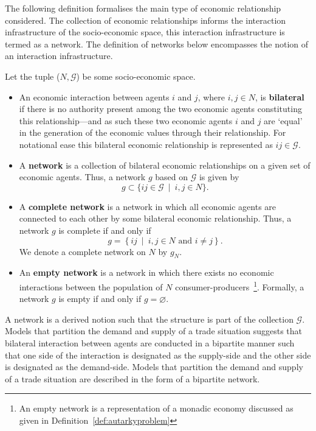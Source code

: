 The following definition formalises the main type of economic relationship considered. The collection of economic relationships informs the interaction infrastructure of the socio-economic space, this interaction infrastructure is termed as a network. The definition of networks below encompasses the notion of an interaction infrastructure.
\begin{definition}[Networks] \label{def:networks}
Let the tuple ($N, \mathcal{G}$) be some socio-economic space.
\begin{itemize}
	\item An economic interaction between agents $i$ and $j$, where $i,j \in N$, is \textbf{bilateral} if there is no authority present among the two economic agents constituting this relationship---and as such these two economic agents $i$ and $j$ are `equal' in the generation of the economic values through their relationship. For notational ease this bilateral economic relationship is represented as $ij \in \mathcal{G}$.

	\item A \textbf{network} is a collection of bilateral economic relationships on a given set of economic agents. Thus, a network $g$ based on $\mathcal{G}$ is given by
	    \begin{equation}
	    g \subset \{ ij \in \mathcal{G} ~ \mid ~ i,j \in N \} .
	    \end{equation}

	\item A \textbf{complete network} is a network in which all economic agents are connected to each other by some bilateral economic relationship. Thus, a network $g$ is complete if and only if
	    \begin{equation}
	    g = \left\{ ij ~ \mid ~ i,j \in N \mbox{ and } i \neq j \right\} .
	    \end{equation}
	We denote a complete network on $N$ by $g_{N}$.

	\item An \textbf{empty network} is a network in which there exists no economic interactions between the population of $N$ consumer-producers~\footnote{An empty network is a representation of a monadic economy discussed as given in Definition~\ref{def:autarkyproblem}}. Formally, a network $g$ is empty if and only if $g = \varnothing$.
\end{itemize}
\end{definition}
A network is a derived notion such that the structure is part of the collection $\mathcal{G}$. Models that partition the demand and supply of a trade situation suggests that bilateral interaction between agents are conducted in a bipartite manner such that one side of the interaction is designated as the supply-side and the other side is designated as the demand-side. Models that partition the demand and supply of a trade situation are described in the form of a bipartite network.
